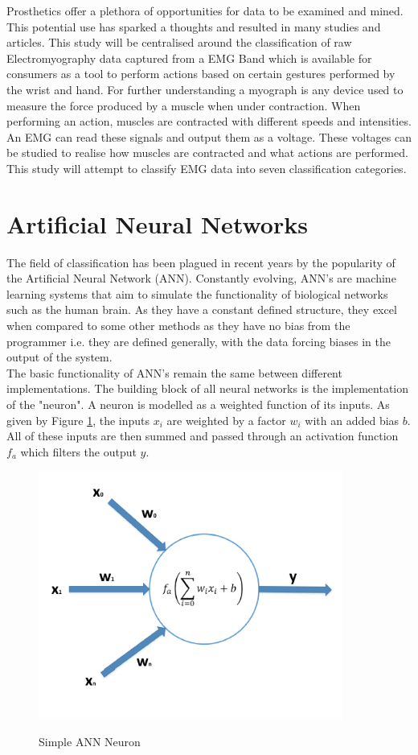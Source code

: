 \documentclass[11pt]{article}
\begin{document}
	\noindent
	Prosthetics offer a plethora of opportunities for data to be examined and mined. This potential use has sparked a thoughts and resulted in many studies and articles. This study will be centralised around the classification of raw Electromyography data captured from a EMG Band which is available for consumers as a tool to perform actions based on certain gestures performed by the wrist and hand. For further understanding a myograph is any device used to measure the force produced by a muscle when under contraction. When performing an action, muscles are contracted with different speeds and intensities. An EMG can read these signals and output them as a voltage. These voltages can be studied to realise how muscles are contracted and what actions are performed. This study will attempt to classify EMG data into seven classification categories.
	
	\section{Artificial Neural Networks}
	The field of classification has been plagued in recent years by the popularity of the Artificial Neural Network (ANN). Constantly evolving, ANN's are machine learning systems that aim to simulate the functionality of biological networks such as the human brain. As they have a constant defined structure, they excel when compared to some other methods as they have no bias from the programmer i.e. they are defined generally, with the data forcing biases in the output of the system.\\
	
	\noindent
	The basic functionality of ANN's remain the same between different implementations. The building block of all neural networks is the implementation of the "neuron". A neuron is modelled as a weighted function of its inputs. As given by Figure \ref{fig:neuron}, the inputs $x_i$ are weighted by a factor $w_i$ with an added bias $b$. All of these inputs are then summed and passed through an activation function $f_a$ which filters the output $y$.\\
	
	\begin{figure}[H]
		\centering
		\includegraphics[width=10cm]{Figures/neuron}
		\caption{Simple ANN Neuron}\cite{Bonaccorso2017}
		\label{fig:neuron}
	\end{figure}
\end{document}
